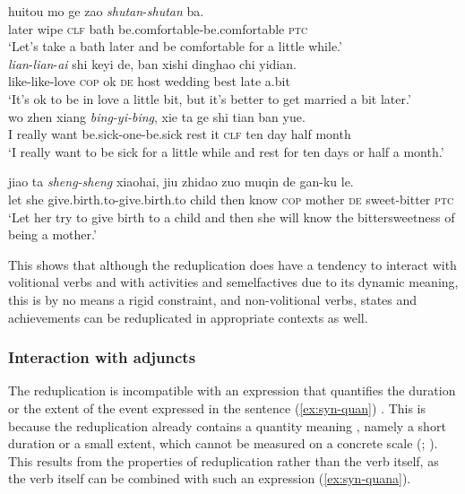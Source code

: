 \ex\label{ex:redup-achi-stat2}
\gll huitou mo ge zao \textit{shutan}-\textit{shutan} ba.\footnotemark\\
later wipe \textsc{clf} bath be.comfortable-be.comfortable \textsc{ptc}\\
\glt `Let's take a bath later and be comfortable for a little while.'\\

\ex\label{ex:redup-achi-stat3}
\gll \textit{lian}-\textit{lian}-\textit{ai} shi keyi de, ban xishi dinghao chi yidian.\footnotemark\\
like-like-love \textsc{cop} ok \textsc{de} host wedding best late a.bit\\
\glt `It's ok to be in love a little bit, but it's better to get married a bit later.'\\

\ex\label{ex:redup-achi-stat4}
\gll wo zhen xiang \textit{bing-yi-bing}, xie ta ge shi tian ban yue.\\
I really want be.sick-one-be.sick rest it \textsc{clf} ten day half month\\ 
\glt `I really want to be sick for a little while and rest for ten days or half a month.'

\ex\label{ex:redup-achi-stat5}
\gll jiao ta \textit{sheng-sheng} xiaohai, jiu zhidao zuo muqin de gan-ku le.\\
let she give.birth.to-give.birth.to child then know \textsc{cop} mother \textsc{de} sweet-bitter \textsc{ptc}\\ 
\glt `Let her try to give birth to a child and then she will know the bittersweetness of being a mother.'
\z
\z


This shows that although the reduplication does have a tendency to interact with volitional verbs and with activities and semelfactives due to its dynamic meaning, 
this is by no means a rigid constraint, 
and non\hyp{}volitional verbs, states and achievements can be reduplicated in appropriate contexts as well.




\subsubsection{Interaction with adjuncts}\label{sec:adjuncts}

The reduplication is incompatible with an expression that quantifies the duration or the extent of the event expressed in the sentence (\ref{ex:syn-quan}) \citetext{ \citealp[83--84]{Li1998}; \citealp[114--115]{Chen2005}}.
This is  because the reduplication already contains a quantity meaning \citetext{\citealp[84]{Li1998}; \citealp[114--115]{Chen2005}}, namely a short duration or a small extent,
which cannot be measured on a concrete scale (\citealt[155]{XiaoMcEnery2004}; \citealt[333]{SuiHu2016}).
This results from the properties of reduplication rather than the verb itself,
as the verb itself can be combined with such an expression (\ref{ex:syn-quana}).

